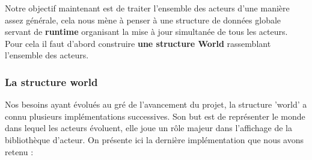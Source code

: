 \documentclass[a4paper,10pt]{article}
\begin{document}
\hfill
\newline
Notre objectif maintenant est de traiter l'ensemble des acteurs d'une manière assez générale, cela nous mène à penser à une structure de données globale servant de \textbf{runtime} organisant la mise à jour simultanée de tous les acteurs.\\
Pour cela il faut d'abord construire \textbf{une structure World} rassemblant l'ensemble des acteurs.
\subsubsection{La structure world}
Nos besoins ayant évolués au gré de l'avancement du projet, la structure 'world' a connu plusieurs implémentations successives. Son but est de représenter le monde dans lequel les acteurs évoluent, elle joue un rôle majeur dans l'affichage de la bibliothèque d'acteur. On présente ici la dernière implémentation que nous avons retenu : 
\end{document}
